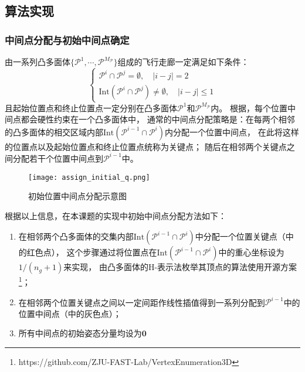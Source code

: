 \subsection{算法实现}\label{subsec:impl_of_traj_opt_algo}
\subsubsection{中间点分配与初始中间点确定}
由一系列凸多面体$\{\mathcal{P}^1,\cdots,\mathcal{P}^{M_\mathcal{P}}\}$组成的飞行走廊一定满足如下条件：
\begin{equation}
  \begin{cases}
    \mathcal{P}^i \cap \mathcal{P}^j = \emptyset, \quad \vert i-j \vert = 2 \\
    \text{Int}(\mathcal{P}^i \cap \mathcal{P}^j) \neq \emptyset, \quad \vert i-j \vert \leq 1
  \end{cases}
  \label{equ:conditions_of_sfc}
\end{equation}
且起始位置点和终止位置点一定分别在凸多面体$\mathcal{P}^1$和$\mathcal{P}^{M_\mathcal{P}}$内。
根据，每个位置中间点都会硬性约束在一个凸多面体中，
通常的中间点分配策略是：在每两个相邻的凸多面体的相交区域内部$\text{Int}(\mathcal{P}^{i-1} \cap \mathcal{P}^i)$内分配一个位置中间点，
在此将这样的位置点以及起始位置点和终止位置点统称为关键点；
随后在相邻两个关键点之间分配若干个位置中间点到$\mathcal{P}^{i-1}$中。

\begin{figure}[ht]
  \centering
  \texttt{[image: assign\_initial\_q.png]}
  \caption{初始位置中间点分配示意图}
  \label{fig:assign_initial_q}
\end{figure}

根据以上信息，在本课题的实现中初始中间点分配方法如下：
\begin{enumerate}
  \renewcommand{\labelenumi}{(\theenumi)}
  \item 在相邻两个凸多面体的交集内部$\text{Int}(\mathcal{P}^{i-1} \cap \mathcal{P}^i)$中分配一个位置关键点（中的红色点），
  这个步骤通过将位置点在$\text{Int}(\mathcal{P}^{i-1} \cap \mathcal{P}^i)$中的重心坐标设为$1/(n_g+1)$来实现，
  由凸多面体的H-表示法枚举其顶点的算法使用开源方案\footnote{https://github.com/ZJU-FAST-Lab/VertexEnumeration3D}；
  \item 在相邻两个位置关键点之间以一定间距作线性插值得到一系列分配到$\mathcal{P}^{i-1}$中的位置中间点（中的灰色点）；
  \item 所有中间点的初始姿态分量均设为$\textbf{0}$
\end{enumerate}


